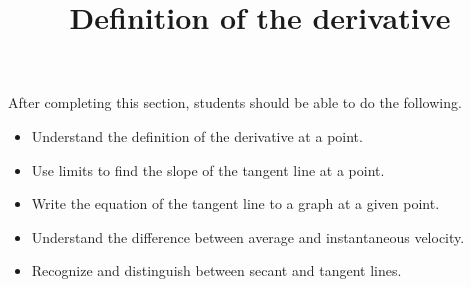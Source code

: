 \documentclass{ximera}
\title{Definition of the derivative}
\begin{document}
\begin{abstract}
\end{abstract}

\maketitle

\begin{sectionOutcomes}

After completing this section, students should be able to do the following.

\begin{itemize}
	\item Understand the definition of the derivative at a point.
	\item Use limits to find the slope of the tangent line at a point.
	\item Write the equation of the tangent line to a graph at a given point.
	\item Understand the difference between average and instantaneous velocity.
	\item Recognize and distinguish between secant and tangent lines.
\end{itemize}

\end{sectionOutcomes}
\end{document}
